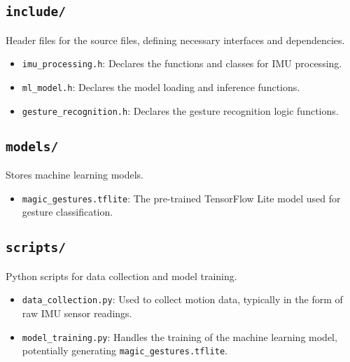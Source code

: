\subsection*{\texttt{include/}}
Header files for the source files, defining necessary interfaces and dependencies.

\begin{itemize}
	\item \texttt{imu\_processing.h}: Declares the functions and classes for IMU processing.
	\item \texttt{ml\_model.h}: Declares the model loading and inference functions.
	\item \texttt{gesture\_recognition.h}: Declares the gesture recognition logic functions.
\end{itemize}

\subsection*{\texttt{models/}}
Stores machine learning models.

\begin{itemize}
	\item \texttt{magic\_gestures.tflite}: The pre-trained TensorFlow Lite model used for gesture classification.
\end{itemize}

\subsection*{\texttt{scripts/}}
Python scripts for data collection and model training.

\begin{itemize}
	\item \texttt{data\_collection.py}: Used to collect motion data, typically in the form of raw IMU sensor readings.
	\item \texttt{model\_training.py}: Handles the training of the machine learning model, potentially generating \texttt{magic\_gestures.tflite}.
\end{itemize}




